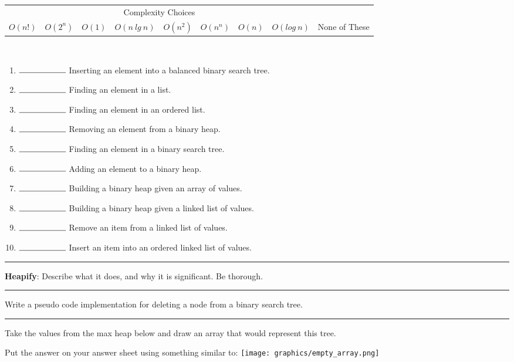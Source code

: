 \documentclass[12pt]{exam}
\newcommand{\seperate}{\begin{center}\noindent\rule{18cm}{0.75pt}\end{center}}
\begin{document}
\begin{questions}
    \begin{tabular}{ c  c  c  c  c  c  c  c c }
        \multicolumn{8}{c}{Complexity Choices} \\
        $O(n!)$ & $O(2^n)$ & $O(1)$ & $O(n\ lg\ n)$ & $O(n^2)$ & $O(n^n)$ & $O(n)$ & $O(log\ n)$ & None of These \\
    \end{tabular}
    \\
    \renewcommand{\theenumi}{\Alph{enumi}}
    \begin{enumerate}
        \item $\rule{2cm}{0.15mm}$ Inserting an element into a balanced binary search tree.
        \item $\rule{2cm}{0.15mm}$ Finding an element in a list.
        \item $\rule{2cm}{0.15mm}$ Finding an element in an ordered list.
        \item $\rule{2cm}{0.15mm}$ Removing an element from a binary heap.
        \item $\rule{2cm}{0.15mm}$ Finding an element in a binary search tree.
        \item $\rule{2cm}{0.15mm}$ Adding an element to a binary heap.
        \item $\rule{2cm}{0.15mm}$ Building a binary heap given an array of values.
        \item $\rule{2cm}{0.15mm}$ Building a binary heap given a linked list of values.
        \item $\rule{2cm}{0.15mm}$ Remove an item from a linked list of values.
        \item $\rule{2cm}{0.15mm}$ Insert an item into an ordered linked list of values.
    \end{enumerate}

    \seperate

    \question[10] \textbf{Heapify}: Describe what it does, and why it is significant. Be thorough.


    \seperate

    \question[15] Write a pseudo code implementation for deleting a node from a binary search tree.

    \seperate

    \question[10] Take the values from the max heap below and draw an array that would represent this tree.

    Put the answer on your answer sheet using something similar to:  \texttt{[image: graphics/empty\_array.png]}


\end{questions}
\end{document}
